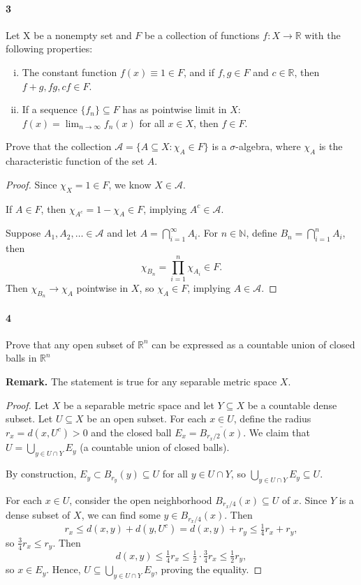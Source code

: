 \documentclass[12pt]{article}
\newlength{\myparskip}
\newenvironment{fullbox}{\begin{lrbox}{\savefullbox}\begin{minipage}{\dimexpr\textwidth-2\fboxsep\relax}\setlength{\parskip}{\myparskip}}{\end{minipage}\end{lrbox}\framebox[\textwidth]{\usebox{\savefullbox}}}
\newenvironment{pbox}[1][]{\begin{fullbox}\ifx#1\empty\else\paragraph{#1}\fi}{\end{fullbox}}
\newcommand{\N}{\mathbb{N}}
\newcommand{\R}{\mathbb{R}}
\newcommand{\<}{\langle}
\renewcommand{\>}{\rangle}
\newcommand{\clo}{\overline}
\renewcommand{\AA}{\mathcal{A}}
\begin{document}
\newpage
\begin{pbox}[3]
    Let X be a nonempty set and $F$ be a collection of functions $f : X \to \R$ with the following properties:
    \begin{enumerate}[(i)]
        \item The constant function $f(x) \equiv 1 \in F$, and if $f, g \in F$ and $c \in \R$, then $f + g, fg, cf \in F$.
        \item If a sequence $\{f_n\} \subseteq F$ has as pointwise limit in $X$: $f(x) = \lim_{n \to \infty} f_n(x)$ for all $x \in X$, then $f \in F$.
    \end{enumerate}
    Prove that the collection $\AA = \{A \subseteq X : \chi_A \in F\}$ is a $\sigma$-algebra, where $\chi_A$ is the characteristic function of the set $A$.
\end{pbox}

\begin{proof}
    Since $\chi_X = 1 \in F$, we know $X \in \AA$.

    If $A \in F$, then $\chi_{A^c} = 1 - \chi_A \in F$, implying $A^c \in \AA$.

    Suppose $A_1, A_2, \ldots \in \AA$ and let $A = \bigcap_{i=1}^{\infty} A_i$. For $n \in \N$, define $B_n = \bigcap_{i=1}^{n} A_i$, then
    \[
        \chi_{B_n} = \prod_{i=1}^{n} \chi_{A_i} \in F.
    \]
    Then $\chi_{B_n} \to \chi_A$ pointwise in $X$, so $\chi_A \in F$, implying $A \in \AA$.

\end{proof}



\begin{pbox}[4]
    Prove that any open subset of $\R^n$ can be expressed as a countable union of closed balls in $\R^n$

    \textbf{Remark.} The statement is true for any separable metric space $X$.
\end{pbox}

\begin{proof}
    Let $X$ be a separable metric space and let $Y \subseteq X$ be a countable dense subset. Let $U \subseteq X$ be an open subset. For each $x \in U$, define the radius $r_x = d(x, U^c) > 0$ and the closed ball $E_x = \clo{B_{r_x/2}(x)}$. We claim that $U = \bigcup_{y \in U \cap Y} E_y$ (a countable union of closed balls).

    By construction, $E_y \subset B_{r_y}(y) \subseteq U$ for all $y \in U \cap Y$, so $\bigcup_{y \in U \cap Y} E_y \subseteq U$.

    For each $x \in U$, consider the open neighborhood $B_{r_x/4}(x) \subseteq U$ of $x$. Since $Y$ is a dense subset of $X$, we can find some $y \in B_{r_x/4}(x)$. Then
    \[
        r_x
            \leq d(x, y) + d(y, U^c) 
            = d(x, y) + r_y
            \leq \tfrac{1}{4}r_x + r_y,
    \]
    so $\frac{3}{4}r_x \leq r_y$. Then
    \[
        d(x, y)
            \leq \tfrac{1}{4}r_x
            \leq \tfrac{1}{2} \cdot \tfrac{3}{4}r_x
            \leq \tfrac{1}{2}r_y,
    \]
    so $x \in E_y$. Hence, $U \subseteq \bigcup_{y \in U \cap Y} E_y$, proving the equality.

\end{proof}
\end{document}
